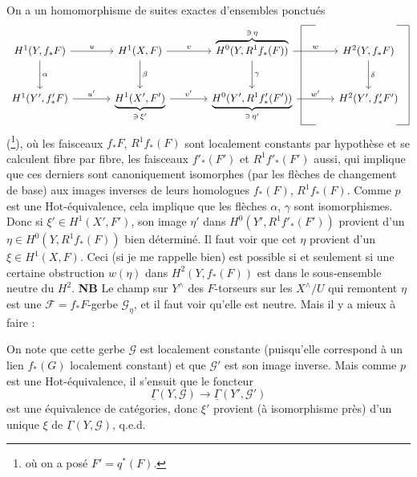 \documentclass[11pt]{article}
\newcommand{\printedpage}[1]{\marginpar{\footnotesize p.~#1}}
\newcommand{\msp}[1]{\marginpar{\footnotesize [#1]}}
\newcommand{\Hot}{\mathrm{Hot}}
\begin{document}
\noindent On a un homomorphisme de suites exactes d'ensembles ponctués
\[
\begin{tikzcd}[column sep=large, row sep=large,
  every matrix/.append style={name=m},
  execute at end picture={
    \coordinate (lb) at ([xshift=0.4em]m-2-3.east);
    \coordinate (lt) at ([xshift=1.8em]m-2-3.east);
    \draw (lt |- m-1-3.north) -- (lb |- m-1-3.north) -- (lb |- m-2-3.south) -- (lt |- m-2-3.south);
    \coordinate (rb) at ([xshift=0.6em]m-2-4.east);
    \coordinate (rt) at ([xshift=-0.6em]m-2-4.east);
    \draw (rt |- m-1-3.north) -- (rb |- m-1-3.north) -- (rb |- m-2-3.south) -- (rt |- m-2-3.south);
  }]
H^1(Y, f_*F) \arrow[r, "u"] \arrow[d, "\alpha"] & H^1(X,F) \arrow[r, "v"] \arrow[d, "\beta"] & \overbrace{H^0(Y, R^1 f_*(F))}^{\ni\, \eta} \arrow[r, "w"] \arrow[d, "\gamma"] & H^2(Y, f_*F) \arrow[d, "\delta"] \\
H^1(Y', f'_*F) \arrow[r, "u'"] & \underbrace{H^1(X', F')}_{\ni\, \xi'} \arrow[r, "v'"] & \underbrace{H^0(Y', R^1 f'_*(F'))}_{\ni\, \eta'} \arrow[r, "w'"] & H^2(Y', f'_*F') %
\end{tikzcd}
\]
(\footnote{où on a posé $F' = q^*(F)$.}), où les faisceaux $f_*F$, $R^1 f_*(F)$ sont localement constants par hypothèse et se calculent fibre par fibre, les faisceaux $f'_*(F')$ et $R^1 f'_*(F')$ aussi, qui implique que ces derniers sont
\printedpage{3}
canoniquement isomorphes (par les flèches de changement de base) aux images inverses de leurs homologues $f_*(F)$, $R^1 f_*(F)$. Comme $p$ est une $\Hot$-équivalence, cela implique que les flèches $\alpha$, $\gamma$ sont isomorphismes. Donc si $\xi' \in H^1(X', F')$, son image $\eta'$ dans $H^0(Y', R^1 f'_*(F'))$ provient d'un $\eta \in H^0(Y, R^1 f_*(F))$ bien déterminé. Il faut voir que cet $\eta$ provient d'un $\xi \in H^1(X,F)$. Ceci (si je me rappelle bien) est possible si et seulement si une certaine obstruction $w(\eta)$ dans $H^2(Y, f_*(F))$ est dans le sous-ensemble neutre du $H^2$. \textbf{NB} Le champ sur $Y^\wedge$ des $F$-torseurs sur les $X^\wedge/U$ qui remontent $\eta$ est une $\mathcal{F} = f_*F$-gerbe $\mathcal{G}_\eta$, et il faut voir qu'elle est neutre. Mais il y a mieux à faire :


\msp{page 130}

\noindent On note que cette gerbe $\mathcal{G}$ est localement constante (puisqu'elle correspond à un lien $f_*(G)$ localement constant) et que $\mathcal{G}'$ est son image inverse. Mais comme $p$ est une $\Hot$-équivalence, il s'ensuit que le foncteur
\[
\underline{\Gamma}(Y, \mathcal{G}) \longrightarrow \underline{\Gamma}(Y', \mathcal{G}')
\]
est une équivalence de catégories, donc $\xi'$ provient (à isomorphisme près) d'un unique $\xi$ de $\underline{\Gamma}(Y, \mathcal{G})$, q.e.d.
\end{document}
